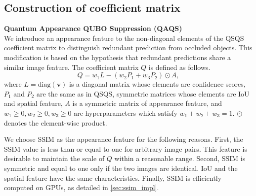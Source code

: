 
\subsection{Construction of coefficient matrix}
\noindent\textbf{Quantum Appearance QUBO Suppression (QAQS)} \\
We introduce an appearance feature to the non-diagonal elements of the QSQS coefficient matrix to distinguish redundant prediction from occluded objects. This modification is based on the hypothesis that redundant predictions share a similar image feature. The coefficient matrix $Q$ is defined as follows.
\begin{equation}
    Q = w_1L - (w_2 P_1 + w_3 P_2)\odot A,\label{eq:qaqs}
\end{equation}
where $L=\mathrm{diag}(\bm{v})$ is a diagonal matrix whose elements are confidence scores, $P_1$ and $P_2$ are the same as in QSQS, symmetric matrices whose elements are IoU and spatial feature, $A$ is a symmetric matrix of appearance feature, and $w_1\geq0, w_2\geq0, w_3\geq0$ are hyperparameters which satisfy $w_1+w_2+w_3=1$. $\odot$ denotes the element-wise product.

We choose SSIM as the appearance feature for the following reasons. First, the SSIM value is less than or equal to one for arbitrary image pairs. This feature is desirable to maintain the scale of $Q$ within a reasonable range. Second, SSIM is symmetric and equal to one only if the two images are identical. IoU and the spatial feature have the same characteristics. Finally, SSIM is efficiently computed on GPUs, as detailed in \cref{sec:ssim_impl}.

